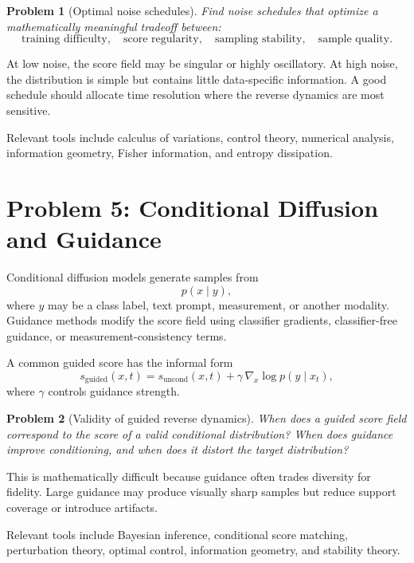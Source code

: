 \documentclass[11pt]{article}
\newtheorem{problem}{Problem}
\begin{document}
\begin{problem}[Optimal noise schedules]
Find noise schedules that optimize a mathematically meaningful tradeoff between:
\begin{equation}
\text{training difficulty}, \quad
\text{score regularity}, \quad
\text{sampling stability}, \quad
\text{sample quality}.
\end{equation}
\end{problem}

At low noise, the score field may be singular or highly oscillatory. At high noise, the distribution is simple but contains little data-specific information. A good schedule should allocate time resolution where the reverse dynamics are most sensitive.

Relevant tools include calculus of variations, control theory, numerical analysis, information geometry, Fisher information, and entropy dissipation.

\section{Problem 5: Conditional Diffusion and Guidance}

Conditional diffusion models generate samples from
\begin{equation}
p(x\mid y),
\end{equation}
where $y$ may be a class label, text prompt, measurement, or another modality. Guidance methods modify the score field using classifier gradients, classifier-free guidance, or measurement-consistency terms.

A common guided score has the informal form
\begin{equation}
s_{\mathrm{guided}}(x,t)
=
s_{\mathrm{uncond}}(x,t)
+
\gamma \, \nabla_x \log p(y\mid x_t),
\end{equation}
where $\gamma$ controls guidance strength.

\begin{problem}[Validity of guided reverse dynamics]
When does a guided score field correspond to the score of a valid conditional distribution? When does guidance improve conditioning, and when does it distort the target distribution?
\end{problem}

This is mathematically difficult because guidance often trades diversity for fidelity. Large guidance may produce visually sharp samples but reduce support coverage or introduce artifacts.

Relevant tools include Bayesian inference, conditional score matching, perturbation theory, optimal control, information geometry, and stability theory.
\end{document}
